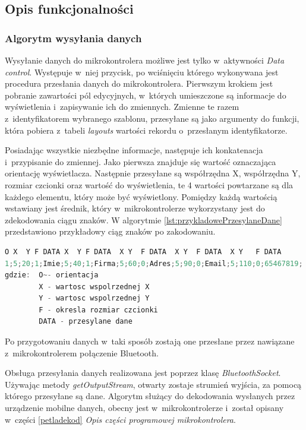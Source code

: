\documentclass[a4paper,12pt, twoside]{article}
\begin{document}
        \subsection{Opis funkcjonalności}
    	
    	\subsubsection{Algorytm wysyłania danych}
    	Wysyłanie danych do mikrokontrolera możliwe jest tylko w~aktywności \textit{Data control}. Występuje w~niej przycisk, po wciśnięciu którego wykonywana jest procedura przesłania danych do mikrokontrolera. Pierwszym krokiem jest pobranie zawartości pól edycyjnych, w~których umieszczone są informacje do wyświetlenia i~zapisywanie ich do zmiennych. Zmienne te razem z~identyfikatorem wybranego szablonu, przesyłane są jako argumenty do funkcji, która pobiera z~tabeli \textit{layouts} wartości rekordu o~przesłanym identyfikatorze.
    	
    	Posiadając wszystkie niezbędne informacje, następuje ich konkatenacja i~przypisanie do zmiennej. Jako pierwsza znajduje się wartość oznaczająca orientację wyświetlacza. Następnie przesyłane są współrzędna X, współrzędna Y, rozmiar czcionki oraz wartość do wyświetlenia, te 4 wartości powtarzane są dla każdego elementu, który może być wyświetlony. Pomiędzy każdą wartością wstawiany jest średnik, który w~mikrokontrolerze wykorzystany jest do zdekodowania ciągu znaków. W algorytmie \ref{lst:przykladowePrzesylaneDane} przedstawiono przykładowy ciąg znaków po zakodowaniu.
    	\begin{lstlisting}[language=C++, label={lst:przykladowePrzesylaneDane}, caption=Przykładowy ciąg przesyłanych danych]
O X  Y F DATA X  Y F DATA  X Y  F DATA  X Y  F DATA  X Y   F DATA	
1;5;20;1;Imie;5;40;1;Firma;5;60;0;Adres;5;90;0;Email;5;110;0;65467819;
gdzie:  O~- orientacja
        X - wartosc wspolrzednej X
        Y - wartosc wspolrzednej Y
        F - okresla rozmiar czcionki
        DATA - przesylane dane\end{lstlisting}
    
    	Po przygotowaniu danych w~taki sposób zostają one przesłane przez nawiązane z~mikrokontrolerem połączenie Bluetooth.

    	Obsługa przesyłania danych realizowana jest poprzez klasę \textit{BluetoothSocket}. Używając metody \textit{getOutputStream}\cite{outputstream}, otwarty zostaje strumień wyjścia, za pomocą którego przesyłane są dane. Algorytm służący do dekodowania wysłanych przez urządzenie mobilne danych, obecny jest w~mikrokontrolerze i~został opisany w~części \ref{petladekod} \textit{Opis części programowej mikrokontrolera}.
    	
\end{document}
